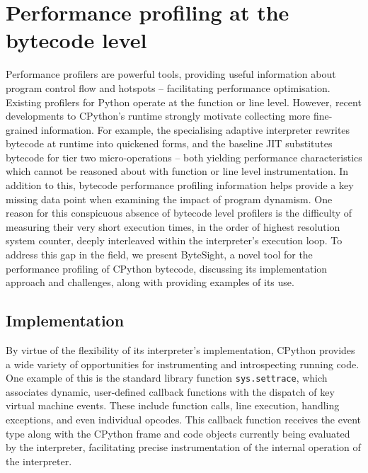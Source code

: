 \chapter{Performance profiling at the bytecode level} %
\label{chap:profiling-bytecode}

Performance profilers are powerful tools, providing useful information about program control flow and hotspots -- facilitating performance optimisation.
Existing profilers for Python operate at the function or line level. However, recent developments to CPython's runtime strongly motivate collecting more fine-grained information. For example, the specialising adaptive interpreter rewrites bytecode at runtime into quickened forms, and the baseline JIT substitutes bytecode for tier two micro-operations -- both yielding performance characteristics which cannot be reasoned about with function or line level instrumentation. %
In addition to this, bytecode performance profiling information helps provide a key missing data point when examining the impact of program dynamism.
One reason for this conspicuous absence of bytecode level profilers is the difficulty of measuring their very short execution times, in the order of highest resolution system counter, deeply interleaved within the interpreter's execution loop.
To address this gap in the field, we present ByteSight, a novel tool for the performance profiling of CPython bytecode, discussing its implementation approach and challenges, along with providing examples of its use.


\section{Implementation}
\label{sec:profiling-bytecode-implementation}

By virtue of the flexibility of its interpreter's implementation, CPython provides a wide variety of opportunities for instrumenting and introspecting running code.
One example of this is the standard library function \texttt{sys.settrace}, which associates dynamic, user-defined callback functions with the dispatch of key virtual machine events. These include function calls, line execution, handling exceptions, and even individual opcodes.
This callback function receives the event type along with the CPython frame and code objects currently being evaluated by the interpreter, facilitating precise instrumentation of the internal operation of the interpreter.


